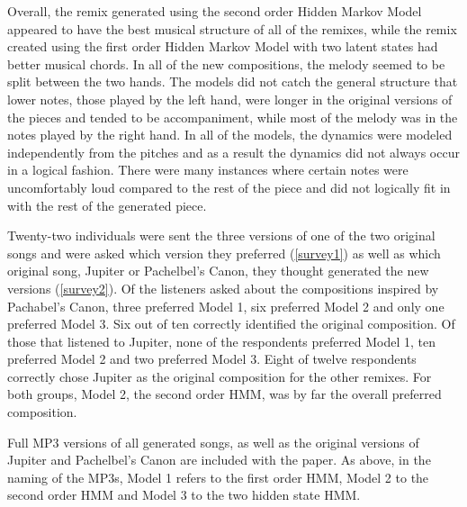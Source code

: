 \documentclass{article} %
\begin{document}
Overall, the remix generated using the second order Hidden Markov Model appeared to have the best musical structure of all of the remixes, while the remix created using the first order Hidden Markov Model with two latent states had better musical chords. In all of the new compositions, the melody seemed to be split between the two hands. The models did not catch the general structure that lower notes, those played by the left hand, were longer in the original versions of the pieces and tended to be accompaniment, while most of the melody was in the notes played by the right hand. In all of the models, the dynamics were modeled independently from the pitches and as a result the dynamics did not always occur in a logical fashion. There were many instances where certain notes were uncomfortably loud compared to the rest of the piece and did not logically fit in with the rest of the generated piece. 

Twenty-two individuals were sent the three versions of one of the two original songs and were asked which version they preferred (\autoref{survey1}) as well as which original song, Jupiter or Pachelbel's Canon, they thought generated the new versions (\autoref{survey2}). Of the listeners asked about the compositions inspired by Pachabel's Canon, three preferred Model 1, six preferred Model 2 and only one preferred Model 3. Six out of ten correctly identified the original composition.  Of those that listened to Jupiter, none of the respondents preferred Model 1, ten preferred Model 2 and two preferred Model 3. Eight of twelve respondents correctly chose Jupiter as the original composition for the other remixes. 
For both groups, Model 2, the second order HMM,  was by far the overall preferred composition.  

Full MP3 versions of all generated songs, as well as the original versions of Jupiter and Pachelbel's Canon are included with the paper.  As above, in the naming of the MP3s, Model 1 refers to the first order HMM, Model 2 to the second order HMM and Model 3 to the two hidden state HMM.
\end{document}
